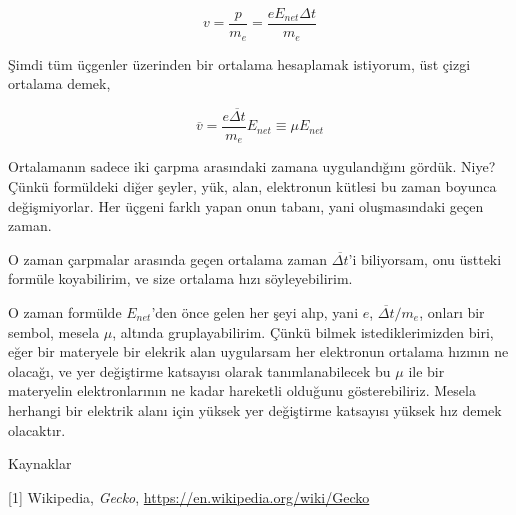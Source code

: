 \documentclass[12pt,fleqn]{article}\usepackage{../../common}
\begin{document}
$$ v = \frac{p}{m_e} = \frac{eE_{net} \Delta t}{m_e}$$ 

Şimdi tüm üçgenler üzerinden bir ortalama hesaplamak istiyorum, üst çizgi
ortalama demek, 

$$ \overline{v} = \frac{e \overline{\Delta t}}{m_e} E_{net} \equiv \mu E_{net} $$ %

Ortalamanın sadece iki çarpma arasındaki zamana uygulandığını gördük. Niye?
Çünkü formüldeki diğer şeyler, yük, alan, elektronun kütlesi bu zaman
boyunca değişmiyorlar. Her üçgeni farklı yapan onun tabanı, yani
oluşmasındaki geçen zaman. 

O zaman çarpmalar arasında geçen ortalama zaman $\overline{\Delta t}$'i
biliyorsam, onu üstteki formüle koyabilirim, ve size ortalama hızı
söyleyebilirim. 

O zaman formülde $E_{net}$'den önce gelen her şeyi alıp, yani $e$,
$\overline{\Delta t} / m_e$, onları bir sembol, mesela $\mu$, altında
gruplayabilirim. Çünkü bilmek istediklerimizden biri, eğer bir materyele
bir elekrik alan uygularsam her elektronun ortalama hızının ne olacağı, ve
yer değiştirme katsayısı olarak tanımlanabilecek bu $\mu$ ile bir
materyelin elektronlarının ne kadar hareketli olduğunu gösterebiliriz.
Mesela herhangi bir elektrik alanı için yüksek yer değiştirme katsayısı
yüksek hız demek olacaktır. 


Kaynaklar

[1] Wikipedia, {\em Gecko}, \url{https://en.wikipedia.org/wiki/Gecko} 
\end{document}

